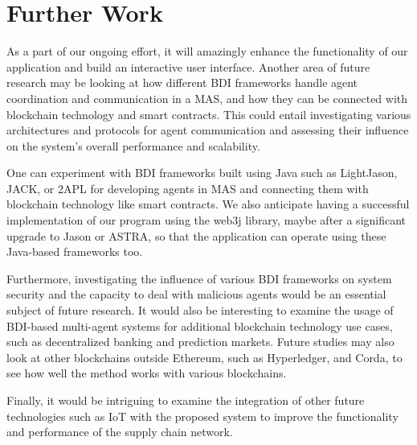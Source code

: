{\chapter{Further Work}}
As a part of our ongoing effort, it will amazingly enhance the functionality of our application and build an interactive user interface. Another area of future research may be looking at how different \ac{BDI} frameworks handle agent coordination and communication in a \ac{MAS}, and how they can be connected with blockchain technology and smart contracts. This could entail investigating various architectures and protocols for agent communication and assessing their influence on the system's overall performance and scalability.

\vspace{.5cm}

One can experiment with \ac{BDI} frameworks built using Java such as LightJason, JACK, or 2APL for developing agents in \ac{MAS} and connecting them with blockchain technology like smart contracts. We also anticipate having a successful implementation of our program using the web3j library, maybe after a significant upgrade to Jason or ASTRA, so that the application can operate using these Java-based frameworks too.

\vspace{.5cm}

Furthermore, investigating the influence of various \ac{BDI} frameworks on system security and the capacity to deal with malicious agents would be an essential subject of future research. It would also be interesting to examine the usage of \ac{BDI}-based multi-agent systems for additional blockchain technology use cases, such as decentralized banking and prediction markets. Future studies may also look at other blockchains outside Ethereum, such as Hyperledger, and Corda, to see how well the method works with various blockchains.

\vspace{.5cm}

Finally, it would be intriguing to examine the integration of other future technologies such as \ac{IoT} with the proposed system to improve the functionality and performance of the supply chain network.